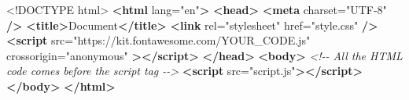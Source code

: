 \documentclass[
]{article}
\newenvironment{Shaded}{\begin{snugshade}}{\end{snugshade}}
\newcommand{\CommentTok}[1]{\textcolor[rgb]{0.56,0.35,0.01}{\textit{#1}}}
\newcommand{\DataTypeTok}[1]{\textcolor[rgb]{0.13,0.29,0.53}{#1}}
\newcommand{\KeywordTok}[1]{\textcolor[rgb]{0.13,0.29,0.53}{\textbf{#1}}}
\newcommand{\NormalTok}[1]{#1}
\newcommand{\OtherTok}[1]{\textcolor[rgb]{0.56,0.35,0.01}{#1}}
\newcommand{\StringTok}[1]{\textcolor[rgb]{0.31,0.60,0.02}{#1}}
\begin{document}
\begin{Shaded}
\begin{Highlighting}[]
\DataTypeTok{\textless{}!DOCTYPE }\NormalTok{html}\DataTypeTok{\textgreater{}}
\KeywordTok{\textless{}html}\OtherTok{ lang=}\StringTok{"en"}\KeywordTok{\textgreater{}}
  \KeywordTok{\textless{}head\textgreater{}}
    \KeywordTok{\textless{}meta}\OtherTok{ charset=}\StringTok{"UTF{-}8"} \KeywordTok{/\textgreater{}}
    \KeywordTok{\textless{}title\textgreater{}}\NormalTok{Document}\KeywordTok{\textless{}/title\textgreater{}}
    \KeywordTok{\textless{}link}\OtherTok{ rel=}\StringTok{"stylesheet"}\OtherTok{ href=}\StringTok{"style.css"} \KeywordTok{/\textgreater{}}
    \KeywordTok{\textless{}script}
\OtherTok{      src=}\StringTok{"https://kit.fontawesome.com/YOUR\_CODE.js"}
\OtherTok{      crossorigin=}\StringTok{"anonymous"}
    \KeywordTok{\textgreater{}\textless{}/script\textgreater{}}
  \KeywordTok{\textless{}/head\textgreater{}}
  \KeywordTok{\textless{}body\textgreater{}}
    \CommentTok{\textless{}!{-}{-} All the HTML code comes before the script tag {-}{-}\textgreater{}}
    \KeywordTok{\textless{}script}\OtherTok{ src=}\StringTok{"script.js"}\KeywordTok{\textgreater{}\textless{}/script\textgreater{}}
  \KeywordTok{\textless{}/body\textgreater{}}
\KeywordTok{\textless{}/html\textgreater{}}
\end{Highlighting}
\end{Shaded}
\end{document}
